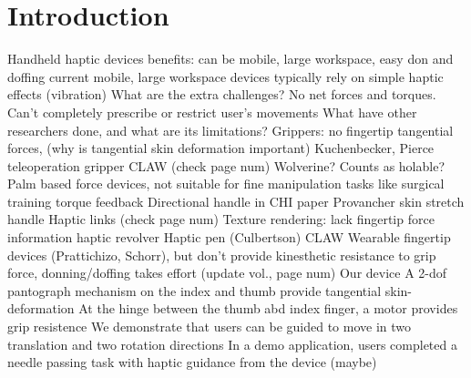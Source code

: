 \section{Introduction}

\begin{outline}
    \1 Handheld haptic devices
        \2 benefits: can be mobile, large workspace, easy don and doffing
        \2 current mobile, large workspace devices typically rely on simple haptic effects (vibration)
    \1 What are the extra challenges?
        \2 No net forces and torques.
        \2 Can't completely prescribe or restrict user's movements 
    \1 What have other researchers done, and what are its limitations?
        \2 Grippers: no fingertip tangential forces, (why is tangential skin deformation important)
            \3 Kuchenbecker, Pierce teleoperation gripper \cite{Pierce201}
            \3 CLAW \cite{Choi2018} (check page num)
            \3 Wolverine? Counts as holable?
        \2 Palm based force devices, not suitable for fine manipulation tasks like surgical training
            \3 \cite{Walker2017} torque feedback 
            \3 Directional handle in CHI paper
            \3 Provancher skin stretch handle \cite{Gleeson2009}
            \3 Haptic links \cite{Strasnick2018} (check page num)
        \2 Texture rendering: lack fingertip force information
            \3 haptic revolver \cite{Whitmire2018}
            \3 Haptic pen (Culbertson)
            \3 CLAW
        \2 Wearable fingertip devices (Prattichizo, Schorr), but don't provide kinesthetic resistance to grip force, donning/doffing takes effort \cite{Pacchierotti2017} (update vol., page num)
    \1 Our device 
        \2 A 2-dof pantograph mechanism on the index and thumb provide tangential skin-deformation 
        \2 At the hinge between the thumb abd index finger, a motor provides grip resistence 
        \2 We demonstrate that users can be guided to move in two translation and two rotation directions
        \2 In a demo application, users completed a needle passing task with haptic guidance from the device (maybe)

\end{outline}

